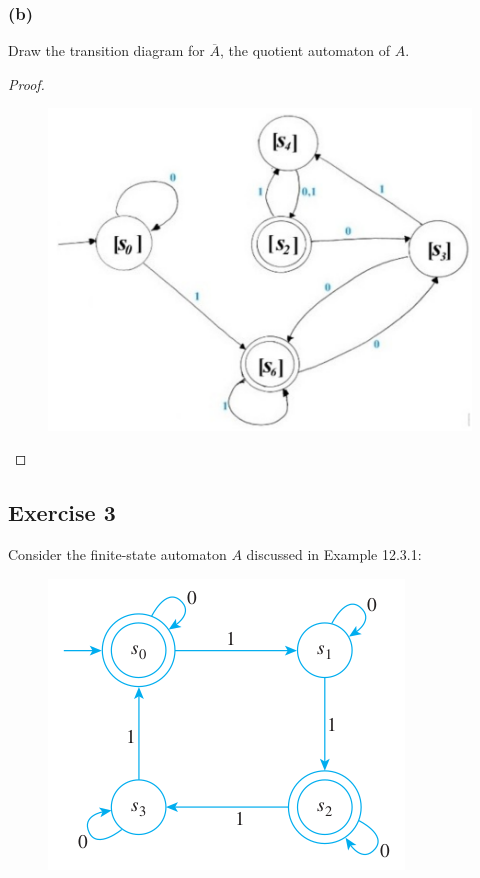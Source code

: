 \documentclass[14pt]{extarticle}
\begin{document}
\subsubsection{(b)}
Draw the transition diagram for \(\overline{A}\), the quotient automaton of \(A\).

\begin{proof}
\begin{figure}[ht!]
\centering
\includegraphics[scale=0.3]{../images/12.3.2.b.png}
\end{figure}
\end{proof}

\subsection{Exercise 3}
Consider the finite-state automaton \(A\) discussed in Example 12.3.1:

\begin{figure}[ht!]
\centering
\includegraphics[scale=0.5]{../images/12.3.3.png}
\end{figure}
\end{document}
